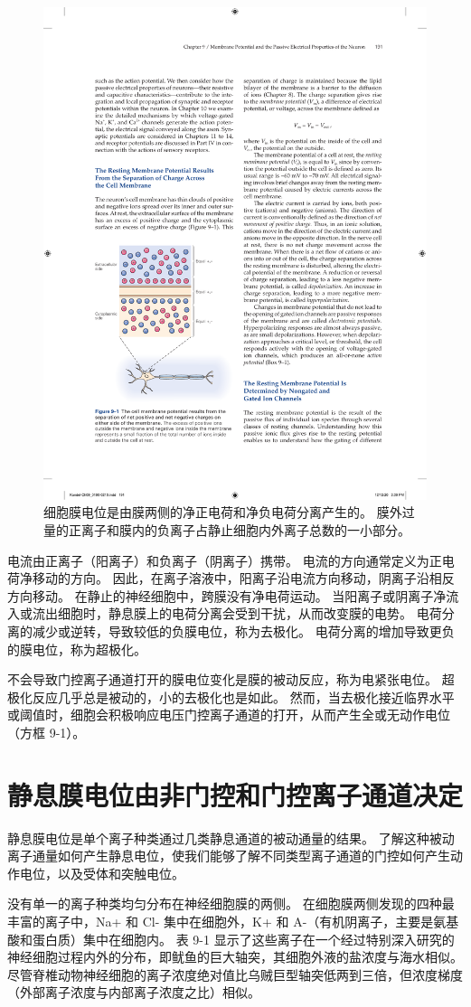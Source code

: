 \begin{figure}[htbp]
	\centering
	\includegraphics[width=0.5\linewidth]{chap09/fig_9_1}
	\caption{细胞膜电位是由膜两侧的净正电荷和净负电荷分离产生的。 膜外过量的正离子和膜内的负离子占静止细胞内外离子总数的一小部分。}
	\label{fig:9_1}
\end{figure}


电流由正离子（阳离子）和负离子（阴离子）携带。
电流的方向通常定义为正电荷净移动的方向。
因此，在离子溶液中，阳离子沿电流方向移动，阴离子沿相反方向移动。
在静止的神经细胞中，跨膜没有净电荷运动。
当阳离子或阴离子净流入或流出细胞时，静息膜上的电荷分离会受到干扰，从而改变膜的电势。
电荷分离的减少或逆转，导致较低的负膜电位，称为去极化。
电荷分离的增加导致更负的膜电位，称为超极化。


不会导致门控离子通道打开的膜电位变化是膜的被动反应，称为电紧张电位。
超极化反应几乎总是被动的，小的去极化也是如此。
然而，当去极化接近临界水平或阈值时，细胞会积极响应电压门控离子通道的打开，从而产生全或无动作电位（方框 9-1）。



\section{静息膜电位由非门控和门控离子通道决定}

静息膜电位是单个离子种类通过几类静息通道的被动通量的结果。
了解这种被动离子通量如何产生静息电位，使我们能够了解不同类型离子通道的门控如何产生动作电位，以及受体和突触电位。


没有单一的离子种类均匀分布在神经细胞膜的两侧。
在细胞膜两侧发现的四种最丰富的离子中，Na+ 和 Cl- 集中在细胞外，K+ 和 A-（有机阴离子，主要是氨基酸和蛋白质）集中在细胞内。
表 9-1 显示了这些离子在一个经过特别深入研究的神经细胞过程内外的分布，即鱿鱼的巨大轴突，其细胞外液的盐浓度与海水相似。
尽管脊椎动物神经细胞的离子浓度绝对值比乌贼巨型轴突低两到三倍，但浓度梯度（外部离子浓度与内部离子浓度之比）相似。


